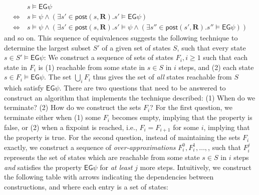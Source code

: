 \documentclass[10pt]{article}
\newcommand{\ctrans}{\ensuremath{\mathbf{R}}\xspace}
\newcommand{\eg}[1]{\ensuremath{\mathsf{EG}#1\xspace}}
\newcommand{\post}[2]{\ensuremath{\mathsf{post}(#1, #2)}\xspace}
\begin{document}
\begin{spacing}{1}
\begin{eqnarray*}[ll]
& \ s \models \eg{\psi}\\
\Leftrightarrow & \ s \models \psi \wedge (\exists s' \in
\post{s}{\ctrans}. s' \models \eg{\psi})\\
\Leftrightarrow & \ s \models \psi \wedge (\exists s' \in
\post{s}{\ctrans}. s' \models \psi \wedge (\exists s'' \in
\post{s'}{\ctrans}. s'' \models \eg{\psi}))
\end{eqnarray*}
and so on. This sequence of equivalences suggests the following technique
to determine the largest subset $S'$ of a given set of states $S$,
such that every state $s \in S' \models \eg{\psi}$: We construct a
sequence of sets of states $F_i, i \geq 1$ such that each state in $F_i$ is (1)
reachable from some state in $s \in S$ in $i$ steps, and (2)
each state $s \in F_i \models \eg{\psi}$. The set $\bigcup_i F_i$ thus
gives the set of \emph{all} states reachable from $S$ which satisfy
$\eg{\psi}$. There are two questions that need to be answered to construct
an algorithm that implements the technique described: (1) When do we
terminate? (2) How do we construct the sets $F_i$? For the first question,
we terminate either when (1) some $F_i$ becomes empty, implying that the
property is false, or (2) when a fixpoint is reached, i.e., $F_i = F_{i+1}$
for some $i$, implying that the property is true. For the second question,
instead of maintaining the sets $F_i$ exactly, we construct a sequence of
\emph{over-approximations} $F_i^0, F_i^1, \ldots,$, such that $F_i^j$
represents the set of states which are reachable from some state $s \in S$
in $i$ steps \emph{and} satisfies the property \eg{\psi} for \emph{at
  least} $j$ more steps. Intuitively, we construct the following table with
arrows indicating the dependencies between constructions, and where each
entry is a set of states:


\end{spacing}
\end{document}
